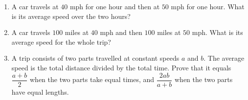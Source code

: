 \begin{enumerate}
\item[(a)] A car travels at $40$ mph for one hour and then at $50$ mph for one hour. What is its average speed over the two hours?
\item[(b)] A car travels $100$ miles at $40$ mph and then $100$ miles at $50$ mph. What is its average speed for the whole trip?
\item[(c)] A trip consists of two parts travelled at constant speeds $a$ and $b$. The average speed is the total distance divided by the total time. Prove that it equals $\dfrac{a+b}{2}$ when the two parts take equal times, and $\dfrac{2ab}{a+b}$ when the two parts have equal lengths.
\end{enumerate}
